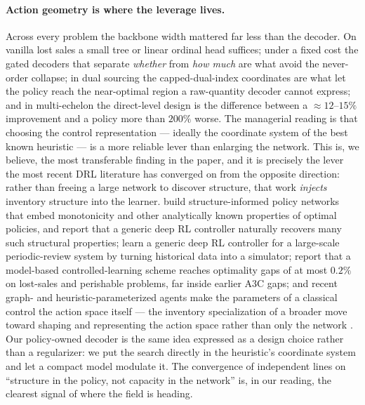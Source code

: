 \documentclass[11pt]{article}
\begin{document}
\paragraph{Action geometry is where the leverage lives.}
Across every problem the backbone width mattered far less than the decoder. On vanilla lost sales a
small tree or linear ordinal head suffices; under a fixed cost the gated decoders that separate
\emph{whether} from \emph{how much} are what avoid the never-order collapse; in dual sourcing the
capped-dual-index coordinates are what let the policy reach the near-optimal region a raw-quantity
decoder cannot express; and in multi-echelon the direct-level design is the difference between a
$\approx 12$--$15\%$ improvement and a policy more than $200\%$ worse. The managerial reading is that
choosing the control representation --- ideally the coordinate system of the best known heuristic ---
is a more reliable lever than enlarging the network. This is, we believe, the most transferable
finding in the paper, and it is precisely the lever the most recent DRL literature has converged on
from the opposite direction: rather than freeing a large network to discover structure, that work
\emph{injects} inventory structure into the learner. \citet{maggiar2025structure} build
structure-informed policy networks that embed monotonicity and other analytically known properties of
optimal policies, and report that a generic deep RL controller naturally recovers many
such structural properties; \citet{madeka2022deepinv} learn a generic deep RL controller for a
large-scale periodic-review system by turning historical data into a simulator; \citet{temizoz2025dcl} report that a model-based controlled-learning scheme reaches
optimality gaps of at most $0.2\%$ on lost-sales and perishable problems, far inside earlier A3C gaps;
and recent graph- and heuristic-parameterized agents make the parameters of a classical control the
action space itself --- the inventory specialization of a broader move toward shaping and
representing the action space rather than only the network \citep{kanervisto2020actionshaping,chandak2019actionrep}.
Our policy-owned decoder is the same idea expressed as a design choice rather
than a regularizer: we put the search directly in the heuristic's coordinate system and let a compact
model modulate it. The convergence of independent lines on ``structure in the policy, not capacity in
the network'' is, in our reading, the clearest signal of where the field is heading.
\end{document}

